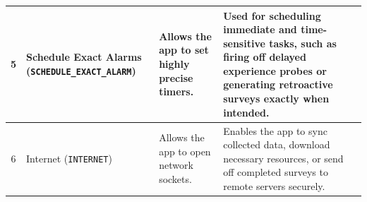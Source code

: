 \documentclass{article}
\begin{document}
\begin{tabularx}{\textwidth}{|c|>{\raggedright\arraybackslash}p{3.5cm}|>{\raggedright\arraybackslash}X|>{\raggedright\arraybackslash}X|}
\hline
5 & Schedule Exact Alarms (\texttt{SCHEDULE\_}\allowbreak\texttt{EXACT\_}\allowbreak\texttt{ALARM}) & Allows the app to set highly precise timers. & Used for scheduling immediate and time-sensitive tasks, such as firing off delayed experience probes or generating retroactive surveys exactly when intended. \\
\hline
6 & Internet (\texttt{INTERNET}) & Allows the app to open network sockets. & Enables the app to sync collected data, download necessary resources, or send off completed surveys to remote servers securely. \\
\hline
\end{tabularx}
\end{document}
